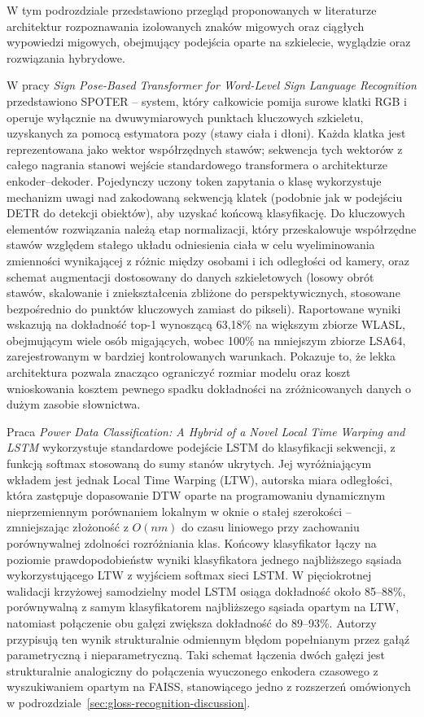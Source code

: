 W tym podrozdziale przedstawiono przegląd proponowanych w literaturze architektur
rozpoznawania izolowanych znaków migowych oraz ciągłych wypowiedzi migowych,
obejmujący podejścia oparte na szkielecie, wyglądzie oraz rozwiązania hybrydowe.

W pracy \emph{Sign Pose-Based Transformer for Word-Level Sign Language Recognition}
\cite{bohacek2022spoter} przedstawiono SPOTER -- system, który całkowicie pomija
surowe klatki RGB i operuje wyłącznie na dwuwymiarowych punktach kluczowych
szkieletu, uzyskanych za pomocą estymatora pozy (stawy ciała i dłoni). Każda klatka
jest reprezentowana jako wektor współrzędnych stawów; sekwencja tych wektorów
z całego nagrania stanowi wejście standardowego transformera o architekturze
enkoder--dekoder. Pojedynczy uczony token zapytania o klasę wykorzystuje mechanizm
uwagi nad zakodowaną sekwencją klatek (podobnie jak w podejściu DETR do detekcji
obiektów), aby uzyskać końcową klasyfikację. Do kluczowych elementów rozwiązania
należą etap normalizacji, który przeskalowuje współrzędne stawów względem stałego
układu odniesienia ciała w celu wyeliminowania zmienności wynikającej z różnic
między osobami i ich odległości od kamery, oraz schemat augmentacji dostosowany
do danych szkieletowych (losowy obrót stawów, skalowanie i zniekształcenia zbliżone
do perspektywicznych, stosowane bezpośrednio do punktów kluczowych zamiast do
pikseli). Raportowane wyniki wskazują na dokładność top-1 wynoszącą 63,18\%
na większym zbiorze WLASL, obejmującym wiele osób migających, wobec 100\%
na mniejszym zbiorze LSA64, zarejestrowanym w bardziej kontrolowanych warunkach.
Pokazuje to, że lekka architektura pozwala znacząco ograniczyć rozmiar modelu
oraz koszt wnioskowania kosztem pewnego spadku dokładności na zróżnicowanych danych
o dużym zasobie słownictwa.

Praca \emph{Power Data Classification: A Hybrid of a Novel Local Time Warping and LSTM}
\cite{li2016ltwlstm} wykorzystuje standardowe podejście LSTM do klasyfikacji
sekwencji, z funkcją softmax stosowaną do sumy stanów ukrytych. Jej wyróżniającym
wkładem jest jednak Local Time Warping (LTW), autorska miara odległości, która
zastępuje dopasowanie DTW oparte na programowaniu dynamicznym nieprzemiennym
porównaniem lokalnym w oknie o stałej szerokości -- zmniejszając złożoność z $O(nm)$
do czasu liniowego przy zachowaniu porównywalnej zdolności rozróżniania klas.
Końcowy klasyfikator łączy na poziomie prawdopodobieństw wyniki klasyfikatora
jednego najbliższego sąsiada wykorzystującego LTW z wyjściem softmax sieci LSTM.
W pięciokrotnej walidacji krzyżowej samodzielny model LSTM osiąga dokładność około
85--88\%, porównywalną z samym klasyfikatorem najbliższego sąsiada opartym na LTW,
natomiast połączenie obu gałęzi zwiększa dokładność do 89--93\%. Autorzy przypisują
ten wynik strukturalnie odmiennym błędom popełnianym przez gałąź parametryczną
i nieparametryczną. Taki schemat łączenia dwóch gałęzi jest strukturalnie
analogiczny do połączenia wyuczonego enkodera czasowego z wyszukiwaniem opartym
na FAISS, stanowiącego jedno z rozszerzeń omówionych
w podrozdziale~\ref{sec:gloss-recognition-discussion}.

